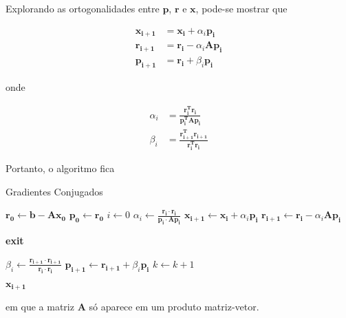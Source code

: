 \documentclass[a4paper,11pt]{article}
\begin{document}
    Explorando as ortogonalidades entre $\mathbf{p}$, $\mathbf{r}$ e $\mathbf{x}$, pode-se mostrar que

    \begin{align*}
        \mathbf{x_{i+1}} &= \mathbf{x_i} + \alpha_i\mathbf{p_i}  \\
        \mathbf{r_{i+1}} &= \mathbf{r_i} - \alpha_i\mathbf{Ap_i} \\
        \mathbf{p_{i+1}} &= \mathbf{r_i} + \beta_i\mathbf{p_i}
    \end{align*}

    onde

    \begin{align*}
        \alpha_i &= \mathbf{\frac{r_i^Tr_i}{p_i^TAp_i}} \\
        \beta_i  &= \mathbf{\frac{r_{i+1}^Tr_{i+1}}{r_i^Tr_i}}
    \end{align*}

    Portanto, o algoritmo fica
    \begin{algorithm}
        \caption{Gradientes Conjugados}
        \begin{algorithmic}[1]
            \State $\mathbf{r_0} \gets \mathbf{b - Ax_0}$
            \State $\mathbf{p_0} \gets \mathbf{r_0}$
            \State $i \gets 0$
            \Loop
                \State $\alpha_i \gets \frac{\mathbf{r_i}\cdot\mathbf{r_i}}{\mathbf{p_i\cdot Ap_i}}$
                \State $\mathbf{x_{i+1}} \gets \mathbf{x_i} + \alpha_i\mathbf{p_i}$
                \State $\mathbf{r_{i+1}} \gets \mathbf{r_i} - \alpha_i\mathbf{Ap_i}$


                    \textbf{exit}
                \EndIf

                \State $\beta_i \gets \frac{\mathbf{r_{i+1}}\cdot\mathbf{r_{i+1}}}{\mathbf{r_i}\cdot\mathbf{r_i}}$
                \State $\mathbf{p_{i+1}} \gets \mathbf{r_{i+1}} + \beta_i\mathbf{p_i}$
                \State $k \gets k + 1$
            \EndLoop

        \Return $\mathbf{x_{i+1}}$

        \end{algorithmic}
    \end{algorithm}

    em que a matriz $\mathbf{A}$ só aparece em um produto matriz-vetor.
\end{document}
